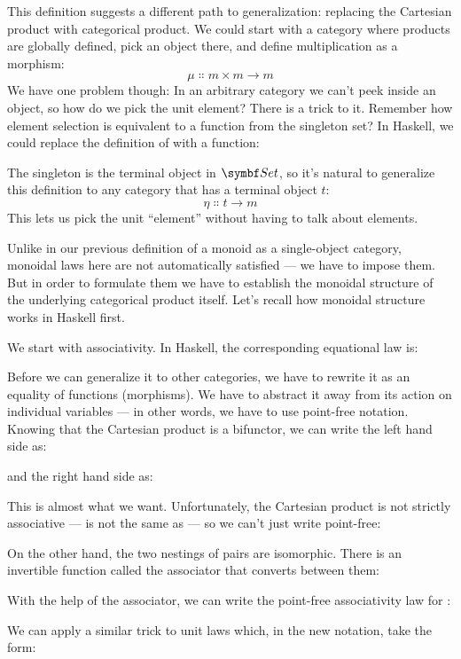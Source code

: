 This definition suggests a different path to generalization: replacing
the Cartesian product with categorical product. We could start with a
category where products are globally defined, pick an object 
there, and define multiplication as a morphism:
\[\mu \Colon m\times{}m \to m\]
We have one problem though: In an arbitrary category we can't peek
inside an object, so how do we pick the unit element? There is a trick
to it. Remember how element selection is equivalent to a function from
the singleton set? In Haskell, we could replace the definition of
 with a function:

The singleton is the terminal object in $\Set$, so it's natural to
generalize this definition to any category that has a terminal object
$t$:
\[\eta \Colon t \to m\]
This lets us pick the unit ``element'' without having to talk about
elements.

Unlike in our previous definition of a monoid as a single-object
category, monoidal laws here are not automatically satisfied --- we have
to impose them. But in order to formulate them we have to establish the
monoidal structure of the underlying categorical product itself. Let's
recall how monoidal structure works in Haskell first.

We start with associativity. In Haskell, the corresponding equational
law is:

Before we can generalize it to other categories, we have to rewrite it
as an equality of functions (morphisms). We have to abstract it away
from its action on individual variables --- in other words, we have to
use point-free notation. Knowing that the Cartesian product is a
bifunctor, we can write the left hand side as:

and the right hand side as:

This is almost what we want. Unfortunately, the Cartesian product is not
strictly associative ---  is not the same as
 --- so we can't just write point-free:

On the other hand, the two nestings of pairs are isomorphic. There is an
invertible function called the associator that converts between them:

With the help of the associator, we can write the point-free
associativity law for :

We can apply a similar trick to unit laws which, in the new notation,
take the form:

